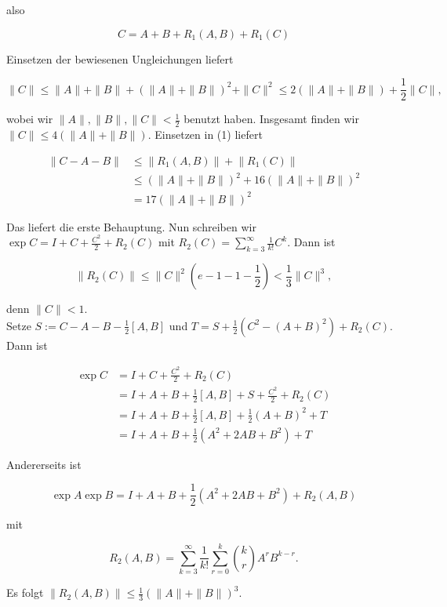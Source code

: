 \documentclass[10pt, letterpaper]{article}
\begin{document}
also

$$
C=A+B+R_{1}(A, B)+R_{1}(C)
$$

Einsetzen der bewiesenen Ungleichungen liefert

$$
\|C\| \leq\|A\|+\|B\|+(\|A\|+\|B\|)^{2}+\|C\|^{2} \leq 2(\|A\|+\|B\|)+\frac{1}{2}\|C\|,
$$

wobei wir $\|A\|,\|B\|,\|C\|<\frac{1}{2}$ benutzt haben. Insgesamt finden wir $\|C\| \leq 4(\|A\|+\|B\|)$. Einsetzen in (1) liefert

$$
\begin{aligned}
\|C-A-B\| & \leq\left\|R_{1}(A, B)\right\|+\left\|R_{1}(C)\right\| \\
& \leq(\|A\|+\|B\|)^{2}+16(\|A\|+\|B\|)^{2} \\
& =17(\|A\|+\|B\|)^{2}
\end{aligned}
$$

Das liefert die erste Behauptung. Nun schreiben wir $\exp C=I+ C+\frac{C^{2}}{2}+R_{2}(C)$ mit $R_{2}(C)=\sum_{k=3}^{\infty} \frac{1}{k!} C^{k}$. Dann ist

$$
\left\|R_{2}(C)\right\| \leq\|C\|^{2}\left(e-1-1-\frac{1}{2}\right)<\frac{1}{3}\|C\|^{3},
$$

denn $\|C\|<1$.\\
Setze $S:=C-A-B-\frac{1}{2}[A, B]$ und $T=S+\frac{1}{2}\left(C^{2}-(A+B)^{2}\right)+R_{2}(C)$. Dann ist

$$
\begin{aligned}
\exp C & =I+C+\frac{C^{2}}{2}+R_{2}(C) \\
& =I+A+B+\frac{1}{2}[A, B]+S+\frac{C^{2}}{2}+R_{2}(C) \\
& =I+A+B+\frac{1}{2}[A, B]+\frac{1}{2}(A+B)^{2}+T \\
& =I+A+B+\frac{1}{2}\left(A^{2}+2 A B+B^{2}\right)+T
\end{aligned}
$$

Andererseits ist

$$
\exp A \exp B=I+A+B+\frac{1}{2}\left(A^{2}+2 A B+B^{2}\right)+R_{2}(A, B)
$$

mit

$$
R_{2}(A, B)=\sum_{k=3}^{\infty} \frac{1}{k!} \sum_{r=0}^{k}\binom{k}{r} A^{r} B^{k-r} .
$$

Es folgt $\left\|R_{2}(A, B)\right\| \leq \frac{1}{3}(\|A\|+\|B\|)^{3}$.\\
\end{document}
